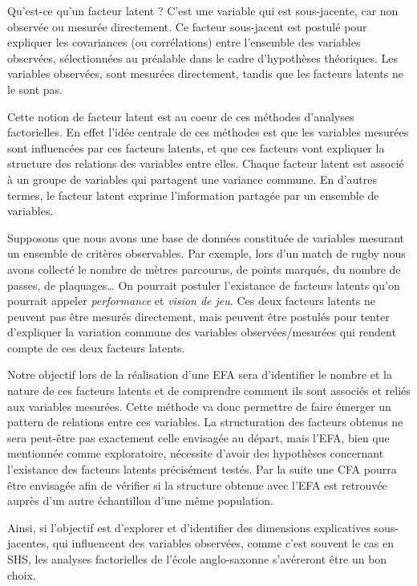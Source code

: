 \documentclass[
  french,
  11pt,
  a4paper,
]{article}
\begin{document}
Qu'est-ce qu'un facteur latent ? C'est une variable qui est
sous-jacente, car non observée ou mesurée directement. Ce facteur
sous-jacent est postulé pour expliquer les covariances (ou corrélations)
entre l'ensemble des variables observées, sélectionnées au préalable
dans le cadre d'hypothèses théoriques. Les variables observées, sont
mesurées directement, tandis que les facteurs latents ne le sont pas.

Cette notion de facteur latent est au coeur de ces méthodes d'analyses
factorielles. En effet l'idée centrale de ces méthodes est que les
variables mesurées sont influencées par ces facteurs latents, et que ces
facteurs vont expliquer la structure des relations des variables entre
elles. Chaque facteur latent est associé à un groupe de variables qui
partagent une variance commune. En d'autres termes, le facteur latent
exprime l'information partagée par un ensemble de variables.

Supposons que nous avons une base de données constituée de variables
mesurant un ensemble de critères observables. Par exemple, lors d'un
match de rugby nous avons collecté le nombre de mètres parcourus, de
points marqués, du nombre de passes, de plaquages\ldots{} On pourrait
postuler l'existance de facteurs latents qu'on pourrait appeler
\emph{performance} et \emph{vision de jeu}. Ces deux facteurs latents ne
peuvent pas être mesurés directement, mais peuvent être postulés pour
tenter d'expliquer la variation commune des variables observées/mesurées
qui rendent compte de ces deux facteurs latents.

Notre objectif lors de la réalisation d'une EFA sera d'identifier le
nombre et la nature de ces facteurs latents et de comprendre comment ils
sont associés et reliés aux variables mesurées. Cette méthode va donc
permettre de faire émerger un pattern de relations entre ces variables.
La structuration des facteurs obtenus ne sera peut-être pas exactement
celle envisagée au départ, mais l'EFA, bien que mentionnée comme
exploratoire, nécessite d'avoir des hypothèses concernant l'existance
des facteurs latents précisément testés. Par la suite une CFA pourra
être envisagée afin de vérifier si la structure obtenue avec l'EFA est
retrouvée auprès d'un autre échantillon d'une même population.

Ainsi, si l'objectif est d'explorer et d'identifier des dimensions
explicatives sous-jacentes, qui influencent des variables observées,
comme c'est souvent le cas en SHS, les analyses factorielles de l'école
anglo-saxonne s'avéreront être un bon choix.
\end{document}
